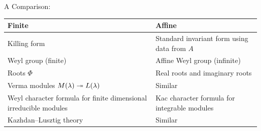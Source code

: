 A Comparison:

\begin{longtable}[]{@{}ll@{}}
\toprule
\begin{minipage}[b]{0.54\columnwidth}\raggedright
Finite\strut
\end{minipage} & \begin{minipage}[b]{0.40\columnwidth}\raggedright
Affine\strut
\end{minipage}\tabularnewline
\midrule
\endhead
\begin{minipage}[t]{0.54\columnwidth}\raggedright
Killing form\strut
\end{minipage} & \begin{minipage}[t]{0.40\columnwidth}\raggedright
Standard invariant form using data from \(A\)\strut
\end{minipage}\tabularnewline
\begin{minipage}[t]{0.54\columnwidth}\raggedright
Weyl group (finite)\strut
\end{minipage} & \begin{minipage}[t]{0.40\columnwidth}\raggedright
Affine Weyl group (infinite)\strut
\end{minipage}\tabularnewline
\begin{minipage}[t]{0.54\columnwidth}\raggedright
Roots \(\Phi\)\strut
\end{minipage} & \begin{minipage}[t]{0.40\columnwidth}\raggedright
Real roots and imaginary roots\strut
\end{minipage}\tabularnewline
\begin{minipage}[t]{0.54\columnwidth}\raggedright
Verma modules \(M(\lambda) \twoheadrightarrow L(\lambda)\)\strut
\end{minipage} & \begin{minipage}[t]{0.40\columnwidth}\raggedright
Similar\strut
\end{minipage}\tabularnewline
\begin{minipage}[t]{0.54\columnwidth}\raggedright
Weyl character formula for finite dimensional irreducible modules\strut
\end{minipage} & \begin{minipage}[t]{0.40\columnwidth}\raggedright
Kac character formula for integrable modules\strut
\end{minipage}\tabularnewline
\begin{minipage}[t]{0.54\columnwidth}\raggedright
Kazhdan--Lusztig theory\strut
\end{minipage} & \begin{minipage}[t]{0.40\columnwidth}\raggedright
Similar\strut
\end{minipage}\tabularnewline
\bottomrule
\end{longtable}

